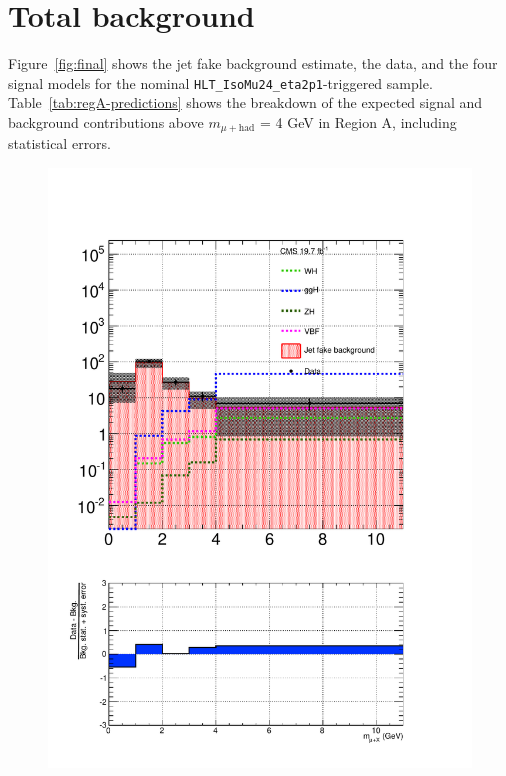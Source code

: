 \section{Total background\label{sec:bkg-total}}

Figure~\ref{fig:final} shows the jet fake background estimate, the data, and the four signal models for the nominal \texttt{HLT\_IsoMu24\_eta2p1}-triggered sample.  Table~\ref{tab:regA-predictions} shows the breakdown of the expected signal and background contributions above $m_{\mu+\text{had}}$ = 4 GeV in Region A, including statistical errors.

\begin{figure}[hbtp]
  \begin{center}
    \includegraphics[width=\cmsFigWidth]{figures/muHadMassCanvas_final_a9_lowMT_v87}

\end{center}
\end{figure}
